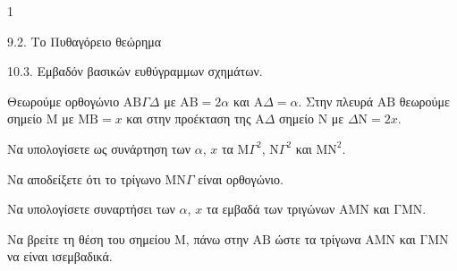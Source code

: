 \begin{ylh}{1}
    \item 9.2. Το Πυθαγόρειο θεώρημα
    \item 10.3. Εμβαδόν βασικών ευθύγραμμων σχημάτων.
\end{ylh}
\begin{figure}
\end{figure}
Θεωρούμε ορθογώνιο $\text{AB}\Gamma\Delta$ με $\text{AB} = 2\alpha$ και $\text{A}\Delta = \alpha$. Στην πλευρά $\text{AB}$ θεωρούμε σημείο $\text{M}$ με $\text{MB} = x$ και στην προέκταση της $\text{A}\Delta$ σημείο $\text{N}$ με $\Delta\text{N} = 2x$.
\begin{alist}
    \item Να υπολογίσετε ως συνάρτηση των $\alpha$, $x$ τα $\text{M}\Gamma^2$, $\text{N}\Gamma^2$ και $\text{MN}^2$.  
    \item Να αποδείξετε ότι το τρίγωνο $\text{MN}\Gamma$ είναι ορθογώνιο.  
    \item Να υπολογίσετε συναρτήσει των $\alpha$, $x$ τα εμβαδά των τριγώνων $\text{AMN}$ και $\text{ΓMN}$.  
    \item Να βρείτε τη θέση του σημείου $\text{M}$, πάνω στην $\text{AB}$ ώστε τα τρίγωνα $\text{AMN}$ και $\text{ΓMN}$ να είναι ισεμβαδικά.  
\end{alist}